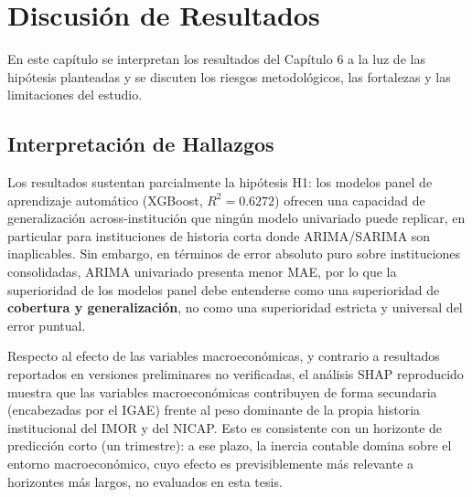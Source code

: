 \chapter{Discusión de Resultados}

En este capítulo se interpretan los resultados del Capítulo 6 a la luz de las hipótesis planteadas y se discuten los riesgos metodológicos, las fortalezas y las limitaciones del estudio.

\section{Interpretación de Hallazgos}
Los resultados sustentan parcialmente la hipótesis H1: los modelos panel de aprendizaje automático (XGBoost, $R^2=0.6272$) ofrecen una capacidad de generalización across-institución que ningún modelo univariado puede replicar, en particular para instituciones de historia corta donde ARIMA/SARIMA son inaplicables. Sin embargo, en términos de error absoluto puro sobre instituciones consolidadas, ARIMA univariado presenta menor MAE, por lo que la superioridad de los modelos panel debe entenderse como una superioridad de \textbf{cobertura y generalización}, no como una superioridad estricta y universal del error puntual.

Respecto al efecto de las variables macroeconómicas, y contrario a resultados reportados en versiones preliminares no verificadas, el análisis SHAP reproducido muestra que las variables macroeconómicas contribuyen de forma secundaria (encabezadas por el IGAE) frente al peso dominante de la propia historia institucional del IMOR y del NICAP. Esto es consistente con un horizonte de predicción corto (un trimestre): a ese plazo, la inercia contable domina sobre el entorno macroeconómico, cuyo efecto es previsiblemente más relevante a horizontes más largos, no evaluados en esta tesis.

